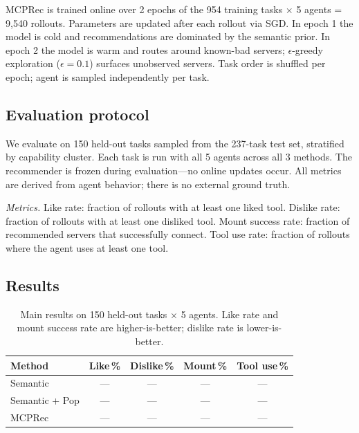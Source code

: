 \documentclass{article} %
\begin{document}
MCPRec is trained online over 2 epochs of the 954 training tasks $\times$ 5 agents = 9{,}540 rollouts. Parameters are updated after each rollout via SGD. In epoch 1 the model is cold and recommendations are dominated by the semantic prior. In epoch 2 the model is warm and routes around known-bad servers; $\epsilon$-greedy exploration ($\epsilon = 0.1$) surfaces unobserved servers. Task order is shuffled per epoch; agent is sampled independently per task.

\subsection{Evaluation protocol}
\label{sec:evalprotocol}

We evaluate on 150 held-out tasks sampled from the 237-task test set, stratified by capability cluster. Each task is run with all 5 agents across all 3 methods. The recommender is frozen during evaluation---no online updates occur. All metrics are derived from agent behavior; there is no external ground truth.

\textit{Metrics.} Like rate: fraction of rollouts with at least one liked tool. Dislike rate: fraction of rollouts with at least one disliked tool. Mount success rate: fraction of recommended servers that successfully connect. Tool use rate: fraction of rollouts where the agent uses at least one tool.

\subsection{Results}
\label{sec:results}

\begin{table}[t]
\begin{center}
\begin{tabular}{lcccc}
\toprule
\textbf{Method} & \textbf{Like\,\%} & \textbf{Dislike\,\%} & \textbf{Mount\,\%} & \textbf{Tool use\,\%} \\
\midrule
Semantic & --- & --- & --- & --- \\
Semantic + Pop & --- & --- & --- & --- \\
MCPRec & --- & --- & --- & --- \\
\bottomrule
\end{tabular}
\end{center}
\caption{Main results on 150 held-out tasks $\times$ 5 agents. Like rate and mount success rate are higher-is-better; dislike rate is lower-is-better.}
\label{tab:main}
\end{table}
\end{document}
